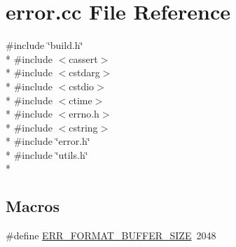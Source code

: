 \section{error.\-cc File Reference}
\label{error_8cc}
{\ttfamily \#include \char`\"{}build.\-h\char`\"{}}\\*
{\ttfamily \#include $<$cassert$>$}\\*
{\ttfamily \#include $<$cstdarg$>$}\\*
{\ttfamily \#include $<$cstdio$>$}\\*
{\ttfamily \#include $<$ctime$>$}\\*
{\ttfamily \#include $<$errno.\-h$>$}\\*
{\ttfamily \#include $<$cstring$>$}\\*
{\ttfamily \#include \char`\"{}error.\-h\char`\"{}}\\*
{\ttfamily \#include \char`\"{}utils.\-h\char`\"{}}\\*
\subsection*{Macros}
\begin{DoxyCompactItemize}
\item 
\#define \hyperlink{error_8cc_a3f6a69bae6a67e88cc0a4f1ff089788b}{E\-R\-R\-\_\-\-F\-O\-R\-M\-A\-T\-\_\-\-B\-U\-F\-F\-E\-R\-\_\-\-S\-I\-Z\-E}~2048
\end{DoxyCompactItemize}
